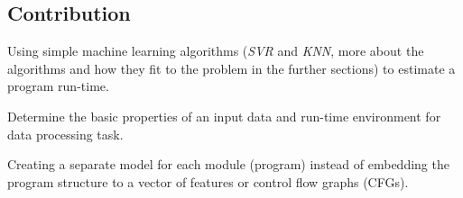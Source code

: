 \subsection{Contribution}
Using simple machine learning algorithms (\textit{SVR} and \textit{KNN}, more about the algorithms and how they fit to the problem in the further sections) to estimate a program run-time. 

Determine the basic properties of an input data and run-time environment for data processing task. 

Creating a separate model for each module (program) instead of embedding the program structure to a vector of features or control flow graphs (CFGs).
